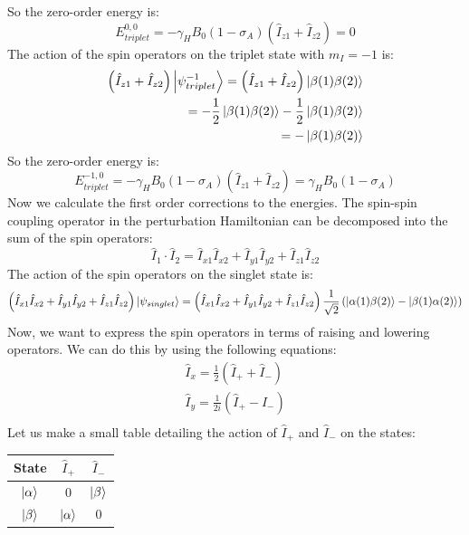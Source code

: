 \documentclass[12pt]{article}
\begin{document}
So the zero-order energy is:
\begin{equation}
  E_{triplet}^{0,0} = -\gamma_{H} B_{0}\left(1-\sigma_{A}\right)\left(\hat{I}_{z 1}+\hat{I}_{z 2}\right) = 0
\end{equation}
The action of the spin operators on the triplet state with $m_I = -1$ is:
\begin{align}
  \left(\hat{I}_{z 1} + \hat{I}_{z 2}\right) \ket{\psi_{triplet}^{-1}} = \left(\hat{I}_{z 1} + \hat{I}_{z 2}\right) \ket{\beta(1)\beta(2)}\\
  = -\frac{1}{2} \ket{\beta(1)\beta(2)} - \frac{1}{2} \ket{\beta(1)\beta(2)}\\
  = -\ket{\beta(1)\beta(2)}
\end{align}
So the zero-order energy is:
\begin{equation}
  E_{triplet}^{-1,0} = -\gamma_{H} B_{0}\left(1-\sigma_{A}\right)\left(\hat{I}_{z 1}+\hat{I}_{z 2}\right) = \gamma_{H} B_{0}\left(1-\sigma_{A}\right)
\end{equation}
Now we calculate the first order corrections to the energies. The spin-spin coupling operator in the perturbation Hamiltonian can be decomposed into the sum of the spin operators:
\begin{equation}
  \hat{I}_{1} \cdot \hat{I}_{2} = \hat{I}_{x 1} \hat{I}_{x 2} + \hat{I}_{y 1} \hat{I}_{y 2} + \hat{I}_{z 1} \hat{I}_{z 2}
\end{equation}
The action of the spin operators on the singlet state is:
\begin{align}
  \left(\hat{I}_{x 1} \hat{I}_{x 2} + \hat{I}_{y 1} \hat{I}_{y 2} + \hat{I}_{z 1} \hat{I}_{z 2}\right) \ket{\psi_{singlet}} = \left(\hat{I}_{x 1} \hat{I}_{x 2} + \hat{I}_{y 1} \hat{I}_{y 2} + \hat{I}_{z 1} \hat{I}_{z 2}\right) \frac{1}{\sqrt{2}} \left( \ket{\alpha(1)\beta(2)} - \ket{\beta(1)\alpha(2)} \right)\\
\end{align}
Now, we want to express the spin operators in terms of raising and lowering operators. We can do this by using the following equations:
\begin{align}
  \hat{I}_{x} = \frac{1}{2} \left( \hat{I}_{+} + \hat{I}_{-} \right)\\
  \hat{I}_{y} = \frac{1}{2i} \left( \hat{I}_{+} - \hat{I}_{-} \right)\\
\end{align}
Let us make a small table detailing the action of $\hat{I}_{+}$ and $\hat{I}_{-}$ on the states:
\begin{center}
  \begin{tabular}{ |c|c|c| } 
    \hline
    State & $\hat{I}_{+}$ & $\hat{I}_{-}$ \\
    \hline
    $\ket{\alpha}$ & 0 & $\ket{\beta}$ \\
    $\ket{\beta}$ & $\ket{\alpha}$ & 0 \\
    \hline
  \end{tabular}
\end{center}
\end{document}
